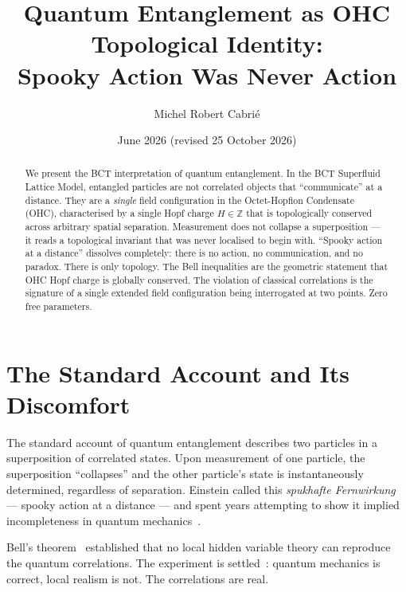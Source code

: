 \documentclass[aps,prl,twocolumn,showpacs,preprintnumbers]{revtex4-2}
\begin{document}

\title{Quantum Entanglement as OHC Topological Identity:\\
Spooky Action Was Never Action}

\author{Michel Robert Cabri\'e}

\date{June 2026 (revised 25 October 2026)}

\begin{abstract}
We present the BCT interpretation of quantum entanglement.
In the BCT Superfluid Lattice Model, entangled particles are
not correlated objects that ``communicate'' at a distance.
They are a \emph{single} field configuration in the
Octet-Hopfion Condensate (OHC), characterised by a single
Hopf charge $H \in \mathbb{Z}$ that is topologically
conserved across arbitrary spatial separation. Measurement
does not collapse a superposition --- it reads a topological
invariant that was never localised to begin with.
``Spooky action at a distance'' dissolves completely:
there is no action, no communication, and no paradox.
There is only topology. The Bell inequalities are the
geometric statement that OHC Hopf charge is globally
conserved. The violation of classical correlations is
the signature of a single extended field configuration
being interrogated at two points. Zero free parameters.
\end{abstract}

\maketitle

\section{The Standard Account and Its Discomfort}

The standard account of quantum entanglement describes two
particles in a superposition of correlated states. Upon
measurement of one particle, the superposition ``collapses''
and the other particle's state is instantaneously determined,
regardless of separation. Einstein called this
\textit{spukhafte Fernwirkung} --- spooky action at a distance
--- and spent years attempting to show it implied incompleteness
in quantum mechanics~\cite{epr}.

Bell's theorem~\cite{bell} established that no local hidden
variable theory can reproduce the quantum correlations. The
experiment is settled~\cite{aspect}: quantum mechanics is
correct, local realism is not. The correlations are real.
\end{document}
